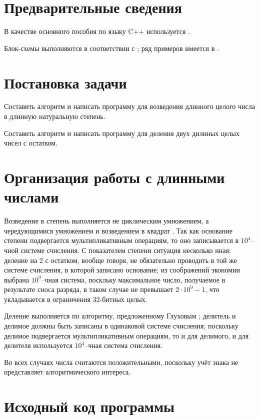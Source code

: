 \documentclass[a4paper,12pt]{article} %
\begin{document}
\setcounter{page}{2}

\section*{Предварительные сведения}

В качестве основного пособия по языку C++ используется \cite{chmyhalo}.


Блок-схемы выполняются в соответствии с \cite{gost-block-scheme};
ряд примеров имеется в \cite{wiki-block-scheme}.


\section*{Постановка задачи}
Составить алгоритм и написать программу
для возведения длинного целого числа в длинную натуральную степень.

Составить алгоритм и написать программу
для деления двух дилнных целых чисел с остатком.

\section*{Организация работы с длинными числами}

Возведение в степень выполняется не циклическим умножением,
а чередующимися умножением и возведением в квадрат \cite{Glukhov}.
Так как основание степени подвергается мультипликативным операциям,
то оно записывается в $10^4$--чной системе счисления.
С показателем степени ситуация несколько иная:
деление на 2 с остатком, вообще говоря,
не обязательно проводить в той же системе счисления, в которой записано основание;
из соображений экономии выбрана $10^9$--чная система,
поскльку максимальное число, получаемое в результате сноса разряда,
в таком случае не превышает $2\cdot 10^9 - 1$,
что укладывается в ограничения 32-битных целых.

Деление выполняется по алгоритму, предложенному Глуховым \cite{Glukhov};
делитель и делимое должны быть записаны в одинаковой системе счисления;
поскольку делимое подвергается мультипликативным операциям,
то и для делимого, и для делителя используется $10^4$--чная система счисления.

Во всех случаях числа считаются положительными,
поскольку учёт знака не представляет алгоритмического интереса.

\section*{Исходный код программы}
\end{document}
